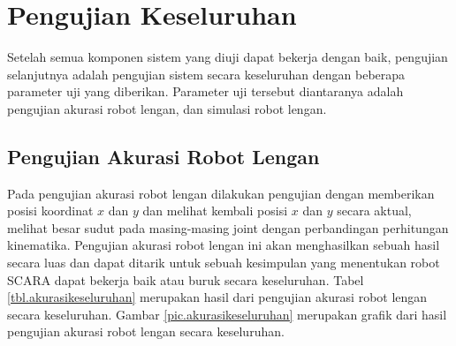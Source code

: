 \section{Pengujian Keseluruhan}
Setelah semua komponen sistem yang diuji dapat bekerja dengan baik, pengujian selanjutnya adalah pengujian sistem secara keseluruhan dengan beberapa parameter uji yang diberikan. Parameter uji tersebut diantaranya adalah pengujian akurasi robot lengan, dan simulasi robot lengan. 

\subsection{Pengujian Akurasi Robot Lengan}
Pada pengujian akurasi robot lengan dilakukan pengujian dengan memberikan posisi koordinat $x$ dan $y$ dan melihat kembali posisi $x$ dan $y$ secara aktual, melihat besar sudut pada masing-masing joint dengan perbandingan perhitungan kinematika. Pengujian akurasi robot lengan ini akan menghasilkan sebuah hasil secara luas dan dapat ditarik untuk sebuah kesimpulan yang menentukan robot SCARA dapat bekerja baik atau buruk secara keseluruhan. Tabel \ref{tbl.akurasikeseluruhan} merupakan hasil dari pengujian akurasi robot lengan secara keseluruhan. Gambar \ref{pic.akurasikeseluruhan} merupakan grafik dari hasil pengujian akurasi robot lengan secara keseluruhan.


